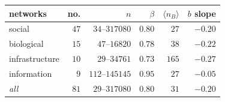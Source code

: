 \begin{center}
\small
\begin{tabular}{lrrrrr}
\hline
networks & no. & $n$ & $\beta$ & $\langle n_B\rangle$ & $b$ slope\\
\hline
social & $47$ & $34$--$317080$ & $0.80$ & $27$ & $-0.20$\\
biological & $15$ & $47$--$16820$ & $0.78$ & $38$ & $-0.22$\\
infrastructure & $10$ & $29$--$34761$ & $0.73$ & $165$ & $-0.27$\\
information & $9$ & $112$--$145145$ & $0.95$ & $27$ & $-0.05$\\
\hline
\emph{all} & $81$ & $29$--$317080$ & $0.80$ & $31$ & $-0.20$\\
\hline
\end{tabular}
\end{center}
